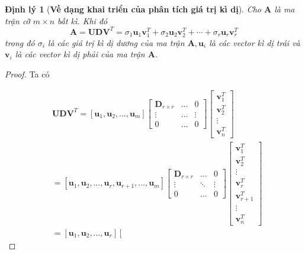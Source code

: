\documentclass[12pt,a4paper,oneside]{report}
\newtheorem{dl}{Định lý}[section]
\numberwithin{equation}{section}
\begin{document}
\begin{dl}[\textbf{Về dạng khai triển của phân tích giá trị kì dị}] Cho $\mathbf{A}$ là ma trận cỡ $m \times n$ bất kì. Khi đó
\begin{equation} \label{eq_4}
\mathbf{A}=\mathbf{U D V}^{T}=\sigma_{1} \mathbf{u}_{1} \mathbf{v}_{1}^{T}+\sigma_{2} \mathbf{u}_{2} \mathbf{v}_{2}^{T}+\cdots+\sigma_{r} \mathbf{u}_{r} \mathbf{v}_{r}^{T}
\end{equation}
trong đó $\sigma_{i}$ là các giá trị kì dị dương của ma trận $\mathbf{A}, \mathbf{u}_{i}$ là các vector kì dị trái và $\mathbf{v}_{i}$ là các vector kì dị phải của ma trận $\mathbf{A}$.
\end{dl}
\begin{proof}
Ta có

$$
\begin{aligned}
	& \mathbf{U D V}^{T}=\left[\mathbf{u}_{1}, \mathbf{u}_{2}, \ldots, \mathbf{u}_{m}\right]\left[\begin{array}{ccc}
		\mathbf{D}_{r \times r} & \ldots & 0 \\
		\vdots & \ldots & \vdots \\
		0 & \ldots & 0
	\end{array}\right]\left[\begin{array}{c}
		\mathbf{v}_{1}^{T} \\
		\mathbf{v}_{2}^{T} \\
		\vdots \\
		\mathbf{v}_{n}^{T}
	\end{array}\right] \\
	& =\left[\mathbf{u}_{1}, \mathbf{u}_{2}, \ldots, \mathbf{u}_{r}, \mathbf{u}_{r+1}, \ldots, \mathbf{u}_{m}\right]\left[\begin{array}{ccc}
		\mathbf{D}_{r \times r} & \ldots & 0 \\
		\vdots & \ddots & \vdots \\
		0 & \ldots & 0
	\end{array}\right]\left[\begin{array}{c}
		\mathbf{v}_{1}^{T} \\
		\mathbf{v}_{2}^{T} \\
		\vdots \\
		\mathbf{v}_{r}^{T} \\
		\mathbf{v}_{r+1}^{T} \\
		\vdots \\
		\mathbf{v}_{n}^{T}
	\end{array}\right] \\
	& \left.=\left[\mathbf{u}_{1}, \mathbf{u}_{2}, \ldots, \mathbf{u}_{r}\right]\left[\begin{array}{ccc}

\end{array}
\end{aligned}$$
\end{proof}
\end{document}
